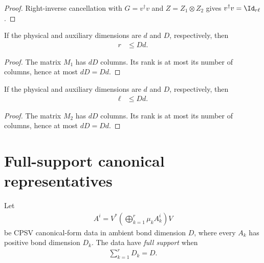 \begin{proof}
    \leanok
    Right-inverse cancellation with $G=v^\dagger v$ and
    $Z=Z_1\otimes Z_2$ gives $v^\dagger v=\Id_{r\ell}$.
\end{proof}

\begin{lemma}
    \label{thm:mpu_right_rank_bound}
    \leanok
    If the physical and auxiliary dimensions are $d$ and $D$, respectively,
    then
    \begin{align}
        r & \leq Dd.
    \end{align}
\end{lemma}

\begin{proof}
    \leanok
    The matrix $M_1$ has $dD$ columns. Its rank is at most its number of
    columns, hence at most $dD=Dd$.
\end{proof}

\begin{lemma}
    \label{thm:mpu_left_rank_bound}
    \leanok
    If the physical and auxiliary dimensions are $d$ and $D$, respectively,
    then
    \begin{align}
        \ell & \leq Dd.
    \end{align}
\end{lemma}

\begin{proof}
    \leanok
    The matrix $M_2$ has $dD$ columns. Its rank is at most its number of
    columns, hence at most $dD=Dd$.
\end{proof}

\section{Full-support canonical representatives}

\begin{definition}
    \label{def:mpu_full_support}
    \leanok
    Let
    \begin{align}
        A^i = V^*\left(\bigoplus_{k=1}^r \mu_k A_k^i\right)V
    \end{align}
    be CPSV canonical-form data in ambient bond dimension $D$, where every
    $A_k$ has positive bond dimension $D_k$.  The data have \emph{full
        support} when
    \begin{align}
        \sum_{k=1}^rD_k=D.
    \end{align}
\end{definition}

